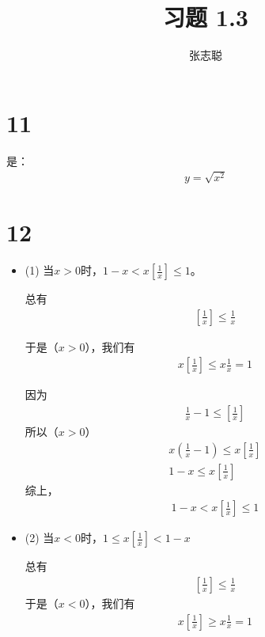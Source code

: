 \documentclass{article}
\begin{document}
\title{习题 1.3}
\author{张志聪}
\maketitle

\section*{11}
是：
\begin{align*}
  y  = \sqrt{x^2}
\end{align*}

\section*{12}

\begin{itemize}
  \item (1) 当$x > 0$时，$1 - x < x \left[\frac{1}{x}\right] \leq 1$。

        总有
        \begin{align*}
          \left[\frac{1}{x}\right] \leq \frac{1}{x}
        \end{align*}

        于是（$x > 0$），我们有
        \begin{align*}
          x \left[\frac{1}{x}\right] \leq x \frac{1}{x} = 1
        \end{align*}

        因为
        \begin{align*}
          \frac{1}{x} - 1 \leq \left[\frac{1}{x}\right]
        \end{align*}
        所以（$x > 0$）
        \begin{align*}
          x(\frac{1}{x} - 1) \leq x \left[\frac{1}{x}\right] \\
          1 - x \leq x \left[\frac{1}{x}\right]
        \end{align*}
        综上，
        \begin{align*}
          1 - x < x \left[\frac{1}{x}\right] \leq 1
        \end{align*}

  \item (2) 当$x < 0$时，$1 \leq x \left[\frac{1}{x}\right] < 1 - x$

        总有
        \begin{align*}
          \left[\frac{1}{x}\right] \leq \frac{1}{x}
        \end{align*}
        于是（$x < 0$），我们有
        \begin{align*}
          x \left[\frac{1}{x}\right] \geq x \frac{1}{x} = 1
        \end{align*}



\end{itemize}
\end{document}
